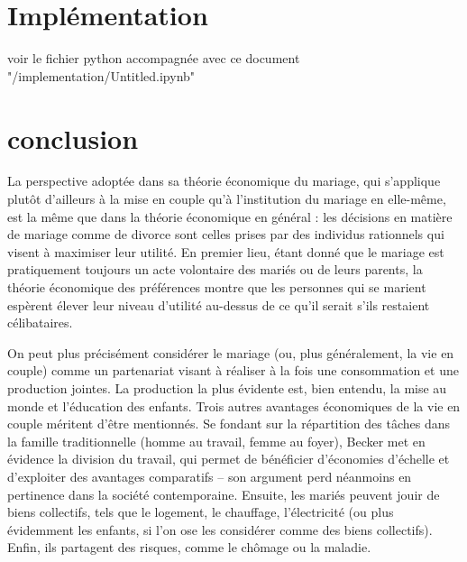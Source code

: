 \section{Implémentation}
\par voir le fichier python accompagnée avec ce document
\\
"/implementation/Untitled.ipynb"
\newpage
\section{conclusion}
\par La perspective adoptée dans sa théorie économique du mariage, qui s'applique plutôt d'ailleurs à la mise en couple qu'à l'institution du mariage en elle-même, est la même que dans la théorie économique en général : les décisions en matière de mariage comme de divorce sont celles prises par des individus rationnels qui visent à maximiser leur utilité. En premier lieu, étant donné que le mariage est pratiquement toujours un acte volontaire des mariés ou de leurs parents, la théorie économique des préférences montre que les personnes qui se marient espèrent élever leur niveau d’utilité au-dessus de ce qu’il serait s’ils restaient célibataires.
\\ 
\par On peut plus précisément considérer le mariage (ou, plus généralement, la vie en couple) comme un partenariat visant à réaliser à la fois une consommation et une production jointes. La production la plus évidente est, bien entendu, la mise au monde et l'éducation des enfants. Trois autres avantages économiques de la vie en couple méritent d’être mentionnés. Se fondant sur la répartition des tâches dans la famille traditionnelle (homme au travail, femme au foyer), Becker met en évidence la division du travail, qui permet de bénéficier d'économies d'échelle et d'exploiter des avantages comparatifs – son argument perd néanmoins en pertinence dans la société contemporaine. Ensuite, les mariés peuvent jouir de biens collectifs, tels que le logement, le chauffage, l’électricité (ou plus évidemment les enfants, si l’on ose les considérer comme des biens collectifs). Enfin, ils partagent des risques, comme le chômage ou la maladie.\cite{conclusion}




